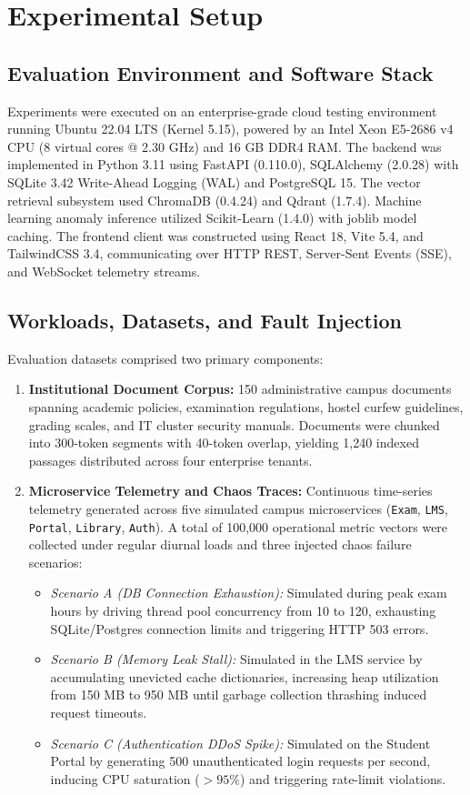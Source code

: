 \documentclass[12pt,onecolumn,draftclsnofoot]{IEEEtran}
\begin{document}
\section{Experimental Setup}

\subsection{Evaluation Environment and Software Stack}
Experiments were executed on an enterprise-grade cloud testing environment running Ubuntu 22.04 LTS (Kernel 5.15), powered by an Intel Xeon E5-2686 v4 CPU (8 virtual cores @ 2.30 GHz) and 16 GB DDR4 RAM. The backend was implemented in Python 3.11 using FastAPI (0.110.0), SQLAlchemy (2.0.28) with SQLite 3.42 Write-Ahead Logging (WAL) and PostgreSQL 15. The vector retrieval subsystem used ChromaDB (0.4.24) and Qdrant (1.7.4). Machine learning anomaly inference utilized Scikit-Learn (1.4.0) with joblib model caching. The frontend client was constructed using React 18, Vite 5.4, and TailwindCSS 3.4, communicating over HTTP REST, Server-Sent Events (SSE), and WebSocket telemetry streams.

\subsection{Workloads, Datasets, and Fault Injection}
Evaluation datasets comprised two primary components:
\begin{enumerate}
    \item \textbf{Institutional Document Corpus:} 150 administrative campus documents spanning academic policies, examination regulations, hostel curfew guidelines, grading scales, and IT cluster security manuals. Documents were chunked into 300-token segments with 40-token overlap, yielding 1,240 indexed passages distributed across four enterprise tenants.
    \item \textbf{Microservice Telemetry and Chaos Traces:} Continuous time-series telemetry generated across five simulated campus microservices (\texttt{Exam}, \texttt{LMS}, \texttt{Portal}, \texttt{Library}, \texttt{Auth}). A total of 100,000 operational metric vectors were collected under regular diurnal loads and three injected chaos failure scenarios:
    \begin{itemize}
        \item \emph{Scenario A (DB Connection Exhaustion):} Simulated during peak exam hours by driving thread pool concurrency from 10 to 120, exhausting SQLite/Postgres connection limits and triggering HTTP 503 errors.
        \item \emph{Scenario B (Memory Leak Stall):} Simulated in the LMS service by accumulating unevicted cache dictionaries, increasing heap utilization from 150 MB to 950 MB until garbage collection thrashing induced request timeouts.
        \item \emph{Scenario C (Authentication DDoS Spike):} Simulated on the Student Portal by generating 500 unauthenticated login requests per second, inducing CPU saturation ($>95\%$) and triggering rate-limit violations.
    \end{itemize}
\end{enumerate}
\end{document}

